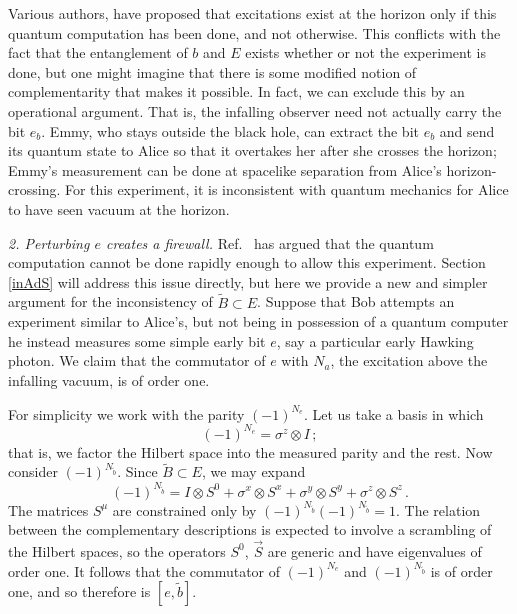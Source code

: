 \documentclass[12pt]{article}
\newcommand{\DM}[1]{{\sl{\textcolor{darkgreen}{#1}}}}
\newcommand{\be}{\begin{equation}}
\newcommand{\ee}{\end{equation}}
\begin{document}
Various authors, \cite{Nomura2,Nomura3,Harlow:2013tf,sch}  %
have proposed that excitations exist at the horizon only if this quantum computation has been done, and not otherwise.  This conflicts with the fact that the entanglement of $b$ and $E$ exists whether or not the experiment is done, but one might imagine that there is some modified notion of complementarity that makes it possible.  In fact, we can exclude this by an operational argument.  That is, the infalling observer need not actually carry the bit $e_b$.  Emmy, who stays outside the black hole, can extract the bit $e_b$ and send its quantum state to Alice so that it overtakes her after she crosses the horizon; Emmy's measurement can be done at spacelike separation from Alice's horizon-crossing.  For this experiment, it is inconsistent with quantum mechanics for Alice to have seen vacuum at the horizon.



{\it 2. Perturbing $e$ creates a firewall.}  Ref.~\cite{Harlow:2013tf} has argued that the quantum computation cannot be done rapidly enough to allow this experiment.  Section \ref{inAdS} will address this issue directly, but here we provide a new and simpler argument  for the inconsistency of $\tilde B \subset E$.  Suppose that Bob attempts an experiment similar to Alice's, but not being in possession of a quantum computer he instead measures some simple early bit $e$, say a particular early Hawking photon.  We claim that the commutator of $e$ with $N_a$, the excitation above the infalling vacuum, is of order one.

For simplicity we work with the parity $(-1)^{N_e}$.  Let us take a basis in which
\be
(-1)^{N_e} = \sigma^z \otimes I \,;  \label{basis}
\ee
that is, we factor the Hilbert space into the measured parity and the rest.  Now consider $(-1)^{N_{{\tilde b}}}$.  Since  $\tilde B \subset E$, we may expand
\be
(-1)^{N_{\tilde b}} = I \otimes S^0 + \sigma^x \otimes S^x + \sigma^y \otimes S^y + \sigma^z \otimes S^z \,.
\ee
The matrices $S^\mu$ are constrained only by $(-1)^{N_{\tilde b}} (-1)^{N_{\tilde b}} = 1$.
The relation between the complementary descriptions is expected to involve a scrambling of the Hilbert spaces, so the operators $S^0$, $\vec S$ are generic and have eigenvalues of order one.  It follows that the commutator of $(-1)^{N_e}$ and $(-1)^{N_{\tilde b}}$ is of order one, and so therefore is $[e,\tilde b]$.
\end{document}
